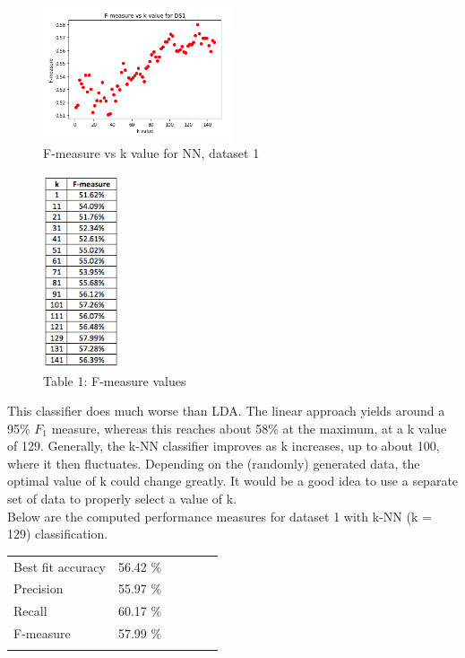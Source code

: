 \documentclass[11pt]{article}
\begin{document}
\begin{figure}[h]
\centering
\includegraphics[width=0.5\textwidth]{ds1_f_k}
\caption{F-measure vs k value for NN, dataset 1}
\end{figure}

\begin{figure}[h]
\centering
\caption*{Table 1: F-measure values}
\includegraphics[width=0.2\textwidth]{ds1_f_k_values}
\end{figure}

This classifier does much worse than LDA. The linear approach yields around a 95\% $F_1$ measure, whereas this reaches about 58\% at the maximum, at a k value of 129. Generally, the k-NN classifier improves as k increases, up to about 100, where it then fluctuates. Depending on the (randomly) generated data, the optimal value of k could change greatly. It would be a good idea to use a separate set of data to properly select a value of k.\\

\noindent
Below are the computed performance measures for dataset 1 with k-NN (k = 129) classification.\\
\begin{tabular}{llllll}
Best fit accuracy & 56.42 \% &  &  &  &  \\
Precision         & 55.97 \% &  &  &  &  \\
Recall            & 60.17 \% &  &  &  &  \\
F-measure         & 57.99 \% &  &  &  &  \\
                  &          &  &  &  &  \\
\end{tabular}
\\
\end{document}
